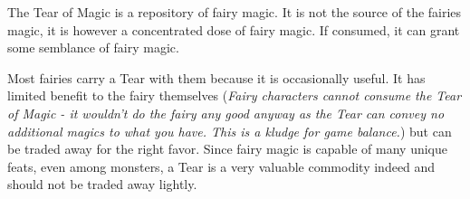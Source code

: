 \documentclass[blue]{guildcamp2}
\begin{document}
\name{\bTearOfMagic{}}

The Tear of Magic is a repository of fairy magic. It is not the source of the fairies magic, it is however a concentrated dose of fairy magic. If consumed, it can grant some semblance of fairy magic. 

Most fairies carry a Tear with them because it is occasionally useful. It has limited benefit to the fairy themselves (\emph{Fairy characters cannot consume the Tear of Magic - it wouldn't do the fairy any good anyway as the Tear can convey no additional magics to what you have. This is a kludge for game balance.}) but can be traded away for the right favor. Since fairy magic is capable of many unique feats, even among monsters, a Tear is a very valuable commodity indeed and should not be traded away lightly.
\end{document}
